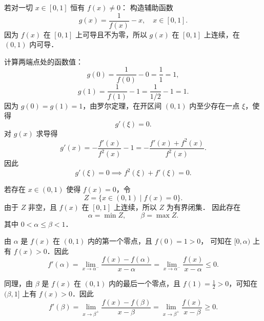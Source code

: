 \begin{myproof}
    若对一切 $x \in [0, 1]$ 恒有 $f(x) \neq 0$：
    构造辅助函数
    \begin{equation}
        g(x) = \frac{1}{f(x)} - x, \quad x \in [0, 1].
    \end{equation}
    因为 $f(x)$ 在 $[0, 1]$ 上可导且不为零，所以 $g(x)$ 在 $[0, 1]$ 上连续，在 $(0, 1)$ 内可导．

    计算两端点处的函数值：
    \begin{equation}
        g(0) = \frac{1}{f(0)} - 0 = \frac{1}{1} = 1,
    \end{equation}
    \begin{equation}
        g(1) = \frac{1}{f(1)} - 1 = \frac{1}{1/2} - 1 = 1.
    \end{equation}
    因为 $g(0) = g(1) = 1$，由罗尔定理，在开区间 $(0, 1)$ 内至少存在一点 $\xi$，使得
    \begin{equation}
        g'(\xi) = 0.
    \end{equation}
    对 $g(x)$ 求导得
    \begin{equation}
        g'(x) = -\frac{f'(x)}{f^2(x)} - 1
        = -\frac{f'(x) + f^2(x)}{f^2(x)}.
    \end{equation}
    因此
    \begin{equation}
        g'(\xi) = 0 \implies f^2(\xi) + f'(\xi) = 0.
    \end{equation}

    若存在 $x \in (0, 1)$ 使得 $f(x) = 0$，令
    \begin{equation}
        Z = \{x \in (0, 1) \mid f(x) = 0\}.
    \end{equation}
    由于 $Z$ 非空，且 $f(x)$ 在 $[0, 1]$ 上连续，所以 $Z$ 为有界闭集．
    因此存在
    \begin{equation}
        \alpha = \min Z,\qquad \beta = \max Z.
    \end{equation}
    其中 $0 < \alpha \leqslant \beta < 1$．

    由 $\alpha$ 是 $f(x)$ 在 $(0,1)$ 内的第一个零点，且 $f(0)=1>0$，
    可知在 $[0,\alpha)$ 上有 $f(x)>0$．因此
    \begin{equation}
        f'(\alpha)
        = \lim_{x\to\alpha^-}\frac{f(x)-f(\alpha)}{x-\alpha}
        = \lim_{x\to\alpha^-}\frac{f(x)}{x-\alpha}
        \leqslant 0.
    \end{equation}

    同理，由 $\beta$ 是 $f(x)$ 在 $(0,1)$ 内的最后一个零点，且
    $f(1)=\frac12>0$，可知在 $(\beta,1]$ 上有 $f(x)>0$．因此
    \begin{equation}
        f'(\beta)
        = \lim_{x\to\beta^+}\frac{f(x)-f(\beta)}{x-\beta}
        = \lim_{x\to\beta^+}\frac{f(x)}{x-\beta}
        \geqslant 0.
    \end{equation}


\end{myproof}
